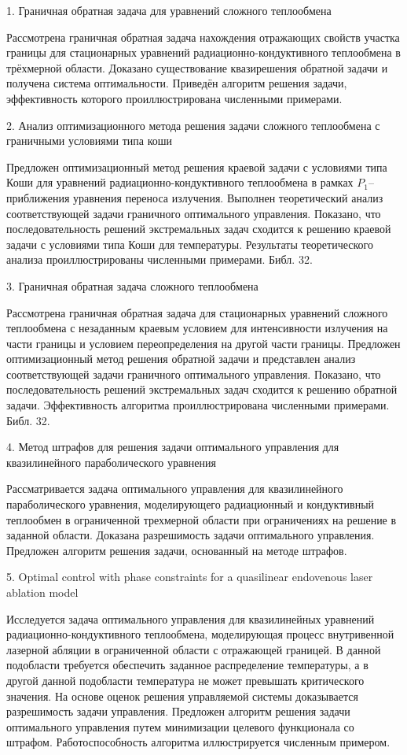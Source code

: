 1. Граничная обратная задача для уравнений сложного теплообмена

Рассмотрена граничная обратная задача нахождения отражающих
свойств участка границы для стационарных уравнений радиационно-кондуктивного
теплообмена в трёхмерной области.
Доказано существование квазирешения обратной задачи и получена система оптимальности.
Приведён алгоритм решения задачи, эффективность которого проиллюстрирована численными примерами.


2. Анализ оптимизационного метода решения задачи сложного теплообмена с граничными условиями типа коши

Предложен оптимизационный метод решения краевой задачи с условиями типа Коши
для уравнений радиационно-кондуктивного теплообмена в рамках $P_1$--приближения
уравнения переноса излучения. Выполнен теоретический анализ соответствующей задачи
граничного оптимального управления.
Показано, что последовательность решений экстремальных задач
сходится к решению краевой задачи с условиями типа Коши для температуры.
Результаты теоретического анализа проиллюстрированы численными примерами.
Библ. 32.


3. Граничная обратная задача сложного теплообмена

Рассмотрена граничная обратная задача для стационарных уравнений сложного теплообмена с незаданным краевым условием для интенсивности излучения на части границы и условием переопределения на другой части границы.
Предложен оптимизационный метод решения обратной задачи и представлен анализ соответствующей задачи
граничного оптимального управления.
Показано, что последовательность решений экстремальных задач
сходится к решению обратной задачи.
Эффективность алгоритма проиллюстрирована численными примерами.
Библ.
32.


4. Метод штрафов для решения задачи оптимального управления для квазилинейного параболического уравнения

Рассматривается задача оптимального управления для квазилинейного параболического уравнения,
моделирующего радиационный и кондуктивный теплообмен в ограниченной трехмерной области при
ограничениях на решение в заданной области.
Доказана разрешимость задачи оптимального управления.
Предложен алгоритм решения задачи, основанный на методе штрафов.


5. Optimal control with phase constraints for a quasilinear endovenous laser ablation model


Исследуется задача оптимального управления для квазилинейных уравнений радиационно-кондуктивного
теплообмена, моделирующая процесс внутривенной лазерной
абляции в ограниченной области с отражающей границей.
В данной подобласти требуется обеспечить заданное
распределение температуры, а в другой
данной подобласти температура не может превышать критического значения.
На основе оценок решения управляемой системы
доказывается разрешимость задачи управления.
Предложен алгоритм
решения задачи оптимального управления путем минимизации целевого функционала со штрафом.
Работоспособность алгоритма иллюстрируется численным примером.


